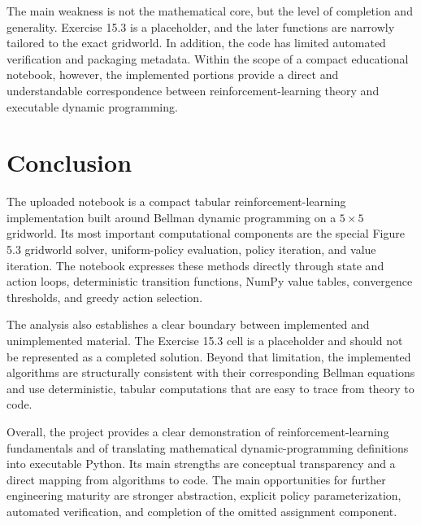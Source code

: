 \documentclass[11pt,a4paper]{article}
\begin{document}
The main weakness is not the mathematical core, but the level of completion and generality. Exercise 15.3 is a placeholder, and the later functions are narrowly tailored to the exact gridworld. In addition, the code has limited automated verification and packaging metadata. Within the scope of a compact educational notebook, however, the implemented portions provide a direct and understandable correspondence between reinforcement-learning theory and executable dynamic programming.

\clearpage
\section*{Conclusion}
The uploaded notebook is a compact tabular reinforcement-learning implementation built around Bellman dynamic programming on a \(5\times5\) gridworld. Its most important computational components are the special Figure 5.3 gridworld solver, uniform-policy evaluation, policy iteration, and value iteration. The notebook expresses these methods directly through state and action loops, deterministic transition functions, NumPy value tables, convergence thresholds, and greedy action selection.

The analysis also establishes a clear boundary between implemented and unimplemented material. The Exercise 15.3 cell is a placeholder and should not be represented as a completed solution. Beyond that limitation, the implemented algorithms are structurally consistent with their corresponding Bellman equations and use deterministic, tabular computations that are easy to trace from theory to code.

Overall, the project provides a clear demonstration of reinforcement-learning fundamentals and of translating mathematical dynamic-programming definitions into executable Python. Its main strengths are conceptual transparency and a direct mapping from algorithms to code. The main opportunities for further engineering maturity are stronger abstraction, explicit policy parameterization, automated verification, and completion of the omitted assignment component.
\end{document}
